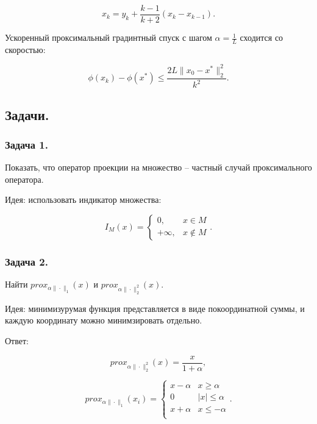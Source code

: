\begin{equation}
    x_k=y_k+\frac{k-1}{k+2}(x_k-x_{k-1}).
\end{equation}

Ускоренный проксимальный градинтный спуск с шагом $\alpha=\frac1L$ сходится со скоростью:

\begin{equation}
    \phi(x_k)-\phi(x^*)\leq\frac{2L\|x_0-x^*\|_2^2}{k^2}.
\end{equation}

\subsection*{Задачи.}

\subsubsection*{Задача 1.}

Показать, что оператор проекции на множество -- частный случай проксимального оператора.

Идея: использовать индикатор множества:

\begin{equation}
    I_M(x)=\begin{cases}
        0,&x\in M\\
        +\infty,&x\not\in M
    \end{cases}.
\end{equation}

\subsubsection*{Задача 2.}

Найти $prox_{\alpha\|\cdot\|_1}(x)$ и $prox_{\alpha\|\cdot\|_2^2}(x)$.

Идея: минимизурумая функция представляется в виде покоординатной суммы, и каждую координату можно минимзировать отдельно.

Ответ:

\begin{equation}
    prox_{\alpha\|\cdot\|_2^2}(x)=\frac{x}{1+\alpha},
\end{equation}

\begin{equation}
    prox_{\alpha\|\cdot\|_1}(x_i)=\begin{cases}
        x-\alpha&x\geq\alpha\\
        0&|x|\leq\alpha\\
        x+\alpha&x\leq-\alpha\\
    \end{cases}.
\end{equation}

